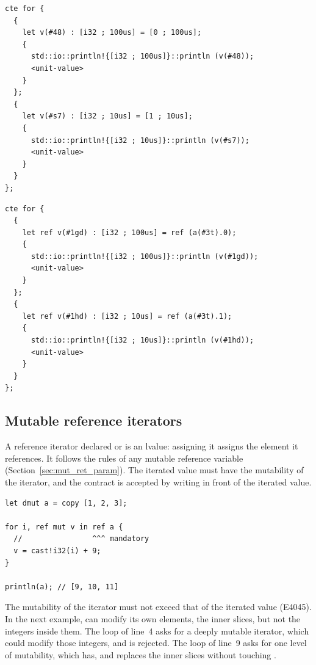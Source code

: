 \begin{lstlisting}[style=myilVerb, caption=By copy iteration on a tuple, label=lst:flow:copy_value_iter_tu]
cte for {
  {
    let v(#48) : [i32 ; 100us] = [0 ; 100us];
    {
      std::io::println!{[i32 ; 100us]}::println (v(#48));
      <unit-value>
    }
  };
  {
    let v(#s7) : [i32 ; 10us] = [1 ; 10us];
    {
      std::io::println!{[i32 ; 10us]}::println (v(#s7));
      <unit-value>
    }
  }
};
\end{lstlisting}

\begin{lstlisting}[style=myilVerb, caption=By reference iteration on a tuple, label=lst:flow:ref_value_iter_tu]
cte for {
  {
    let ref v(#1gd) : [i32 ; 100us] = ref (a(#3t).0);
    {
      std::io::println!{[i32 ; 100us]}::println (v(#1gd));
      <unit-value>
    }
  };
  {
    let ref v(#1hd) : [i32 ; 10us] = ref (a(#3t).1);
    {
      std::io::println!{[i32 ; 10us]}::println (v(#1hd));
      <unit-value>
    }
  }
};
\end{lstlisting}

\subsection{Mutable reference iterators}
\label{sec:flow:mut_ref_iterators}

A reference iterator declared  or  is an lvalue:
assigning it assigns the element it references. It follows the rules of any
mutable reference variable (Section~\ref{sec:mut_ret_param}). The iterated value
must have the mutability of the iterator, and the contract is accepted by writing
 in front of the iterated value.

\begin{lstlisting}[style=coloredverbatim, escapechar=@]
let dmut a = copy [1, 2, 3];

for i, ref mut v in ref a {
  //                ^^^ mandatory
  v = cast!i32(i) + 9;
}

println(a); // [9, 10, 11]
\end{lstlisting}

The mutability of the iterator must not exceed that of the iterated value
(E4045). In the next example,  can modify its own elements, the inner
slices, but not the integers inside them. The loop of line~4 asks for a deeply
mutable iterator, which could modify those integers, and is rejected. The loop
of line~9 asks for one level of mutability, which  has, and replaces
the inner slices without touching .

